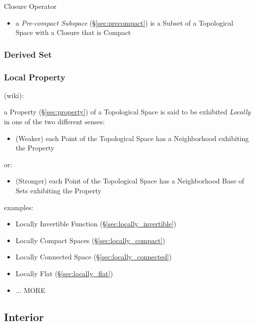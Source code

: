 Closure Operator

\begin{itemize}
  \item a \emph{Pre-compact Subspace} (\S\ref{sec:precompact}) is a Subset of a
    Topological Space with a Closure that is Compact
\end{itemize}



\subsubsection{Derived Set}\label{sec:derived_set}

\subsubsection{Local Property}\label{sec:local_property}

(wiki):

a Property (\S\ref{sec:property}) of a Topological Space is said to be exhibited
\emph{Locally} in one of the two different senses:
\begin{itemize}
  \item (Weaker) each Point of the Topological Space has a Neighborhood
    exhibiting the Property
\end{itemize}
or:
\begin{itemize}
  \item (Stronger) each Point of the Topological Space has a Neighborhood Base
    of Sets exhibiting the Property
\end{itemize}

examples:
\begin{itemize}
  \item Locally Invertible Function (\S\ref{sec:locally_invertible})
  \item Locally Compact Spaces (\S\ref{sec:locally_compact})
  \item Locally Connected Space (\S\ref{sec:locally_connected})
  \item Locally Flat (\S\ref{sec:locally_flat})
  \item ... MORE
\end{itemize}



\subsection{Interior}\label{sec:interior}

